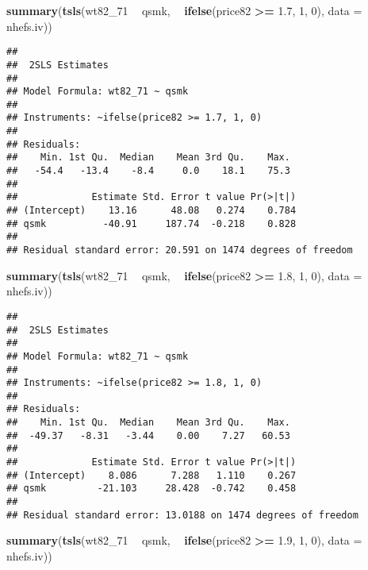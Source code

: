 \documentclass[
  10pt,
]{book}
\newenvironment{Shaded}{\begin{snugshade}}{\end{snugshade}}
\newcommand{\DataTypeTok}[1]{\textcolor[rgb]{0.13,0.29,0.53}{#1}}
\newcommand{\DecValTok}[1]{\textcolor[rgb]{0.00,0.00,0.81}{#1}}
\newcommand{\FloatTok}[1]{\textcolor[rgb]{0.00,0.00,0.81}{#1}}
\newcommand{\KeywordTok}[1]{\textcolor[rgb]{0.13,0.29,0.53}{\textbf{#1}}}
\newcommand{\NormalTok}[1]{#1}
\newcommand{\OperatorTok}[1]{\textcolor[rgb]{0.81,0.36,0.00}{\textbf{#1}}}
\newcommand{\StringTok}[1]{\textcolor[rgb]{0.31,0.60,0.02}{#1}}
\begin{document}
\begin{Shaded}
\begin{Highlighting}[]
\KeywordTok{summary}\NormalTok{(}\KeywordTok{tsls}\NormalTok{(wt82_}\DecValTok{71} \OperatorTok{~}\StringTok{ }\NormalTok{qsmk, }\OperatorTok{~}\StringTok{ }\KeywordTok{ifelse}\NormalTok{(price82 }\OperatorTok{>=}\StringTok{ }\FloatTok{1.7}\NormalTok{, }\DecValTok{1}\NormalTok{, }\DecValTok{0}\NormalTok{), }\DataTypeTok{data =}\NormalTok{ nhefs.iv))}
\end{Highlighting}
\end{Shaded}

\begin{verbatim}
## 
##  2SLS Estimates
## 
## Model Formula: wt82_71 ~ qsmk
## 
## Instruments: ~ifelse(price82 >= 1.7, 1, 0)
## 
## Residuals:
##    Min. 1st Qu.  Median    Mean 3rd Qu.    Max. 
##   -54.4   -13.4    -8.4     0.0    18.1    75.3 
## 
##             Estimate Std. Error t value Pr(>|t|)
## (Intercept)    13.16      48.08   0.274    0.784
## qsmk          -40.91     187.74  -0.218    0.828
## 
## Residual standard error: 20.591 on 1474 degrees of freedom
\end{verbatim}

\begin{Shaded}
\begin{Highlighting}[]
\KeywordTok{summary}\NormalTok{(}\KeywordTok{tsls}\NormalTok{(wt82_}\DecValTok{71} \OperatorTok{~}\StringTok{ }\NormalTok{qsmk, }\OperatorTok{~}\StringTok{ }\KeywordTok{ifelse}\NormalTok{(price82 }\OperatorTok{>=}\StringTok{ }\FloatTok{1.8}\NormalTok{, }\DecValTok{1}\NormalTok{, }\DecValTok{0}\NormalTok{), }\DataTypeTok{data =}\NormalTok{ nhefs.iv))}
\end{Highlighting}
\end{Shaded}

\begin{verbatim}
## 
##  2SLS Estimates
## 
## Model Formula: wt82_71 ~ qsmk
## 
## Instruments: ~ifelse(price82 >= 1.8, 1, 0)
## 
## Residuals:
##    Min. 1st Qu.  Median    Mean 3rd Qu.    Max. 
##  -49.37   -8.31   -3.44    0.00    7.27   60.53 
## 
##             Estimate Std. Error t value Pr(>|t|)
## (Intercept)    8.086      7.288   1.110    0.267
## qsmk         -21.103     28.428  -0.742    0.458
## 
## Residual standard error: 13.0188 on 1474 degrees of freedom
\end{verbatim}

\begin{Shaded}
\begin{Highlighting}[]
\KeywordTok{summary}\NormalTok{(}\KeywordTok{tsls}\NormalTok{(wt82_}\DecValTok{71} \OperatorTok{~}\StringTok{ }\NormalTok{qsmk, }\OperatorTok{~}\StringTok{ }\KeywordTok{ifelse}\NormalTok{(price82 }\OperatorTok{>=}\StringTok{ }\FloatTok{1.9}\NormalTok{, }\DecValTok{1}\NormalTok{, }\DecValTok{0}\NormalTok{), }\DataTypeTok{data =}\NormalTok{ nhefs.iv))}
\end{Highlighting}
\end{Shaded}
\end{document}
